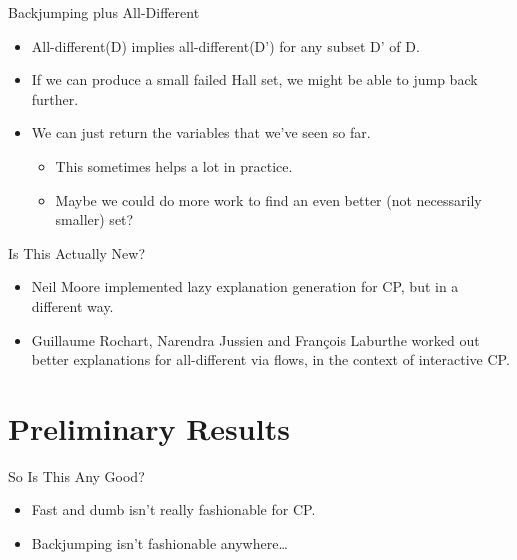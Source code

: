 \documentclass{beamer}
\begin{document}
\begin{frame}{Backjumping plus All-Different}
    \begin{itemize}
        \item All-different(D) implies all-different(D') for any subset D' of D.

        \item If we can produce a small failed Hall set, we might be able to jump back further.

        \item We can just return the variables that we've seen so far.
            \begin{itemize}
                \item This sometimes helps a lot in practice.
                \item Maybe we could do more work to find an even better (not necessarily
                    smaller) set?
            \end{itemize}
    \end{itemize}
\end{frame}

\begin{frame}{Is This Actually New?}
    \begin{itemize}
        \item Neil Moore implemented lazy explanation generation for CP, but in a different way.

        \item Guillaume Rochart, Narendra Jussien and François Laburthe worked out better
            explanations for all-different via flows, in the context of interactive CP.
    \end{itemize}
\end{frame}

\section{Preliminary Results}

\begin{frame}{So Is This Any Good?}
    \begin{itemize}
        \item Fast and dumb isn't really fashionable for CP.

        \item Backjumping isn't fashionable anywhere\ldots
    \end{itemize}
\end{frame}
\end{document}
